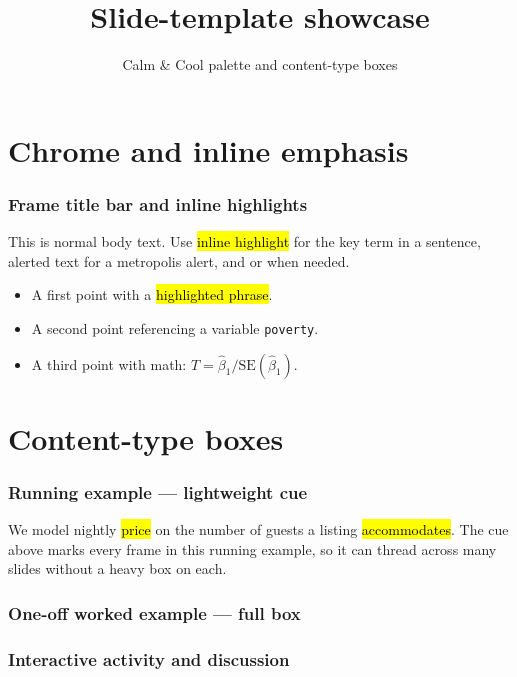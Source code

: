 \documentclass[slidestop,compress,mathserif]{beamer}
\title[Template showcase]{Slide-template showcase}
\subtitle{Calm \& Cool palette and content-type boxes}
\date{}
\begin{document}
\maketitleframe

\section{Chrome and inline emphasis}

\begin{frame}
\frametitle{Frame title bar and inline highlights}

This is normal body text. Use \hl{inline highlight} for the key term in a
sentence, \alert{alerted text} for a metropolis alert, and 
or  when needed.

\bigskip

\begin{itemize}
  \item A first point with a \hl{highlighted phrase}.
  \item A second point referencing a variable \texttt{poverty}.
  \item A third point with math: $T = \hat\beta_1 / \mathrm{SE}(\hat\beta_1)$.
\end{itemize}
\end{frame}

\section{Content-type boxes}

\begin{frame}
\frametitle{Running example --- lightweight cue}

We model nightly \hl{price} on the number of guests a listing
\hl{accommodates}. The cue above marks every frame in this running example,
so it can thread across many slides without a heavy box on each.
\end{frame}

\begin{frame}
\frametitle{One-off worked example --- full box}

\end{frame}

\begin{frame}
\frametitle{Interactive activity and discussion}


\end{frame}
\end{document}

